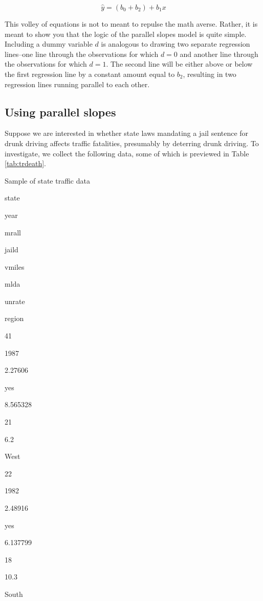 \documentclass[
]{book}
\begin{document}
\begin{equation}
\hat{y} = (b_0 + b_2) + b_1x
\label{eq:pslopesamp1alt}
\end{equation}

This volley of equations is not to meant to repulse the math averse. Rather, it is meant to show you that the logic of the parallel slopes model is quite simple. Including a dummy variable \(d\) is analogous to drawing two separate regression lines--one line through the observations for which \(d=0\) and another line through the observations for which \(d=1\). The second line will be either above or below the first regression line by a constant amount equal to \(b_2\), resulting in two regression lines running parallel to each other.

\hypertarget{using-parallel-slopes}{%
\subsection{Using parallel slopes}\label{using-parallel-slopes}}

Suppose we are interested in whether state laws mandating a jail sentence for drunk driving affects traffic fatalities, presumably by deterring drunk driving. To investigate, we collect the following data, some of which is previewed in Table \ref{tab:trdeath}.

\label{tab:trdeath}Sample of state traffic data

state

year

mrall

jaild

vmiles

mlda

unrate

region

41

1987

2.27606

yes

8.565328

21

6.2

West

22

1982

2.48916

yes

6.137799

18

10.3

South
\end{document}
